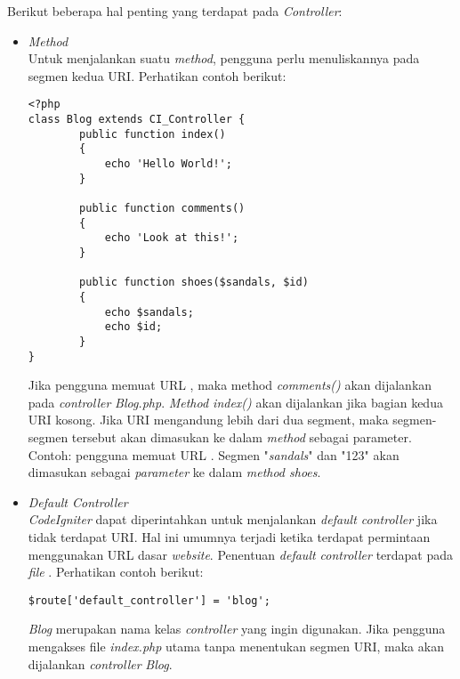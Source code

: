 	Berikut beberapa hal penting yang terdapat pada \textit{Controller}:
	\begin{itemize}
		\item \textit{Method} \\
		Untuk menjalankan suatu \textit{method}, pengguna perlu menuliskannya pada segmen kedua URI. Perhatikan contoh berikut:
\begin{lstlisting}[basicstyle=\ttfamily, frame=single,
columns=fullflexible, keepspaces=true, breaklines=true]
<?php
class Blog extends CI_Controller {
		public function index()
		{
			echo 'Hello World!';
		}
		
		public function comments()
		{
			echo 'Look at this!';
		}
		
		public function shoes($sandals, $id)
		{
			echo $sandals;
			echo $id;
		}
}
\end{lstlisting}
		Jika pengguna memuat URL , maka method \textit{comments()} akan dijalankan pada \textit{controller} \textit{Blog.php}. \textit{Method index()} akan dijalankan jika bagian kedua URI kosong. Jika URI mengandung lebih dari dua segment, maka segmen-segmen tersebut akan dimasukan ke dalam \textit{method} sebagai parameter. Contoh: pengguna memuat URL . Segmen "\textit{sandals}" dan "123" akan dimasukan sebagai \textit{parameter} ke dalam \textit{method shoes}.
		
		\item \textit{Default Controller} \\
		\textit{CodeIgniter} dapat diperintahkan untuk menjalankan \textit{default controller} jika tidak terdapat URI. Hal ini umumnya terjadi ketika terdapat permintaan menggunakan URL dasar \textit{website}. Penentuan \textit{default controller} terdapat pada \textit{file} . Perhatikan contoh berikut:
\begin{lstlisting}[basicstyle=\ttfamily, frame=single,
columns=fullflexible, keepspaces=true, breaklines=true]
$route['default_controller'] = 'blog';
\end{lstlisting} 
		\textit{Blog} merupakan nama kelas \textit{controller} yang ingin digunakan. Jika pengguna mengakses file \textit{index.php} utama tanpa menentukan segmen URI, maka akan dijalankan \textit{controller} \textit{Blog}.
		
		

\end{itemize}
